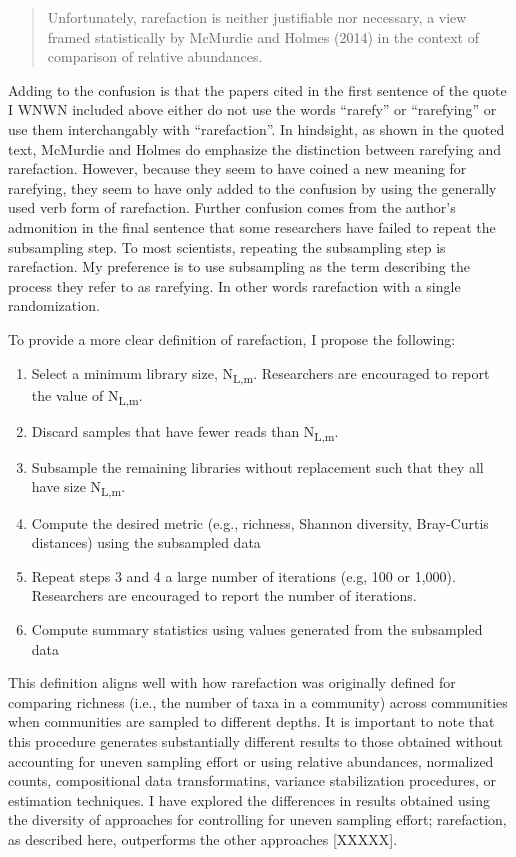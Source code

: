 \documentclass[
]{article}
\providecommand{\tightlist}{%
  \setlength{\itemsep}{0pt}\setlength{\parskip}{0pt}}
\begin{document}
\begin{quote}
Unfortunately, rarefaction is neither justifiable nor necessary, a view
framed statistically by McMurdie and Holmes (2014) in the context of
comparison of relative abundances.
\end{quote}

Adding to the confusion is that the papers cited in the first sentence
of the quote I WNWN included above either do not use the words
``rarefy'' or ``rarefying'' or use them interchangably with
``rarefaction''. In hindsight, as shown in the quoted text, McMurdie and
Holmes do emphasize the distinction between rarefying and rarefaction.
However, because they seem to have coined a new meaning for rarefying,
they seem to have only added to the confusion by using the generally
used verb form of rarefaction. Further confusion comes from the author's
admonition in the final sentence that some researchers have failed to
repeat the subsampling step. To most scientists, repeating the
subsampling step is rarefaction. My preference is to use subsampling as
the term describing the process they refer to as rarefying. In other
words rarefaction with a single randomization.

To provide a more clear definition of rarefaction, I propose the
following:

\begin{enumerate}
\def\labelenumi{\arabic{enumi}.}
\tightlist
\item
  Select a minimum library size, N\textsubscript{L,m}. Researchers are
  encouraged to report the value of N\textsubscript{L,m}.
\item
  Discard samples that have fewer reads than N\textsubscript{L,m}.
\item
  Subsample the remaining libraries without replacement such that they
  all have size N\textsubscript{L,m}.
\item
  Compute the desired metric (e.g., richness, Shannon diversity,
  Bray-Curtis distances) using the subsampled data
\item
  Repeat steps 3 and 4 a large number of iterations (e.g, 100 or 1,000).
  Researchers are encouraged to report the number of iterations.
\item
  Compute summary statistics using values generated from the subsampled
  data
\end{enumerate}

This definition aligns well with how rarefaction was originally defined
for comparing richness (i.e., the number of taxa in a community) across
communities when communities are sampled to different depths. It is
important to note that this procedure generates substantially different
results to those obtained without accounting for uneven sampling effort
or using relative abundances, normalized counts, compositional data
transformatins, variance stabilization procedures, or estimation
techniques. I have explored the differences in results obtained using
the diversity of approaches for controlling for uneven sampling effort;
rarefaction, as described here, outperforms the other approaches
{[}XXXXX{]}.
\end{document}
